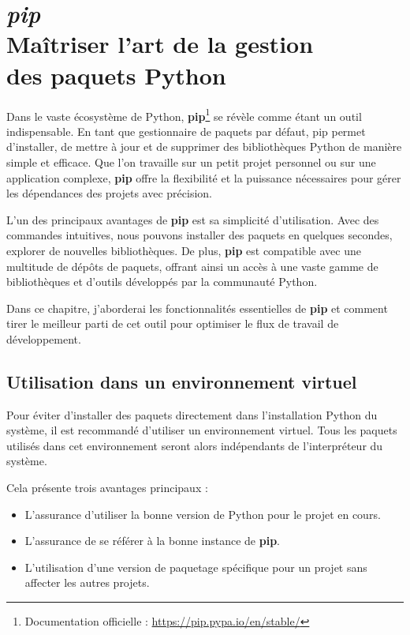 \chapter[\textit{pip}]{\textit{pip} \\ Maîtriser l'art de la gestion \\ des paquets Python}

\bigskip

Dans le vaste écosystème de Python, \textbf{pip}\footnote{Documentation officielle : \url{https://pip.pypa.io/en/stable/}} se révèle comme étant un outil indispensable. En tant que gestionnaire de paquets par défaut, pip permet d'installer, de mettre à jour et de supprimer des bibliothèques Python de manière simple et efficace. Que l'on travaille sur un petit projet personnel ou sur une application complexe, \textbf{pip} offre la flexibilité et la puissance nécessaires pour gérer les dépendances des projets avec précision.

L'un des principaux avantages de \textbf{pip} est sa simplicité d'utilisation. Avec des commandes intuitives, nous pouvons installer des paquets en quelques secondes, explorer de nouvelles bibliothèques. De plus, \textbf{pip} est compatible avec une multitude de dépôts de paquets, offrant ainsi un accès à une vaste gamme de bibliothèques et d'outils développés par la communauté Python.

Dans ce chapitre, j'aborderai les fonctionnalités essentielles de \textbf{pip} et comment tirer le meilleur parti de cet outil pour optimiser le flux de travail de développement. 

\section{Utilisation dans un environnement virtuel}
Pour éviter d'installer des paquets directement dans l'installation Python du système, il est recommandé d'utiliser un environnement virtuel. Tous les paquets utilisés dans cet environnement seront alors indépendants de l'interpréteur du système. 

Cela présente trois avantages principaux :
\begin{itemize}
    \item L'assurance d'utiliser la bonne version de Python pour le projet en cours.
    \item L'assurance de se référer à la bonne instance de \textbf{pip}.
    \item L'utilisation d'une version de paquetage spécifique pour un projet sans affecter les autres projets.
\end{itemize}

